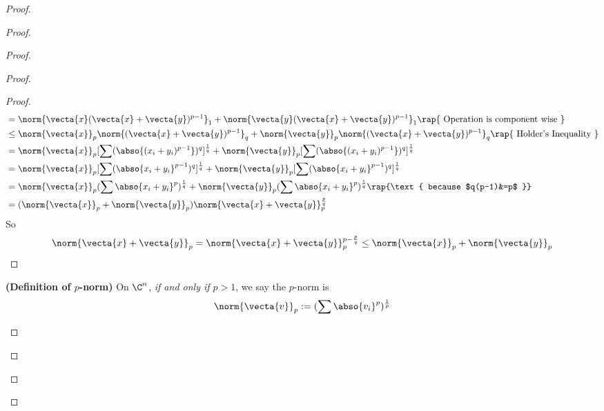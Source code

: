\documentclass{report}
\begin{document}
\begin{proof}
\begin{proof}
\begin{proof}
\begin{proof}
\begin{proof}
\begin{align}
                                &=\norm{\vecta{x}(\vecta{x}+\vecta{y})^{p-1}}_1 + \norm{\vecta{y}(\vecta{x}+\vecta{y})^{p-1}}_1\rap{\text{ Operation is component wise }}\\
&\leq  \norm{\vecta{x}}_p\norm{(\vecta{x}+\vecta{y})^{p-1}}_q+\norm{\vecta{y}}_p\norm{(\vecta{x}+\vecta{y})^{p-1}}_q\rap{\text{ Holder's Inequality }}\\ 
&= \norm{\vecta{x}}_p[\sum (\abso{(x_i+y_i)^{p-1}})^q]^{\frac{1}{q}}+\norm{\vecta{y}}_p[\sum (\abso{(x_i+y_i)^{p-1}})^q]^{\frac{1}{q}}\\
&= \norm{\vecta{x}}_p[\sum (\abso{x_i+y_i}^{p-1})^q]^{\frac{1}{q}}+\norm{\vecta{y}}_p[\sum (\abso{x_i+y_i}^{p-1})^q]^{\frac{1}{q}}\\
&= \norm{\vecta{x}}_p (\sum \abso{x_i+y_i}^p)^{\frac{1}{q}}+\norm{\vecta{y}}_p (\sum \abso{x_i+y_i}^p)^{\frac{1}{q}}\rap{\text{ because $q(p-1)&=p$ }}\\
&= (\norm{\vecta{x}}_p+\norm{\vecta{y}}_p)\norm{\vecta{x}+\vecta{y}}_p^{\frac{p}{q}}
\end{align} 
So 
\begin{equation}
\norm{\vecta{x}+\vecta{y}}_p=\norm{\vecta{x}+\vecta{y}}_p^{p-\frac{p}{q}}\leq \norm{\vecta{x}}_p+\norm{\vecta{y}}_p
\end{equation}
\end{proof}
\begin{definition}
\label{8.1.5}
\textbf{(Definition of $p$-norm)} On $\C^n$,\textit{ if and only if $p>1$}, we say the  $p$-norm is 
\begin{equation}
  \norm{\vecta{v}}_p:= (\sum \abso{v_i}^p)^{\frac{1}{p}}
\end{equation}
\end{definition}

\end{proof}
\end{proof}
\end{proof}
\end{proof}
\end{document}
